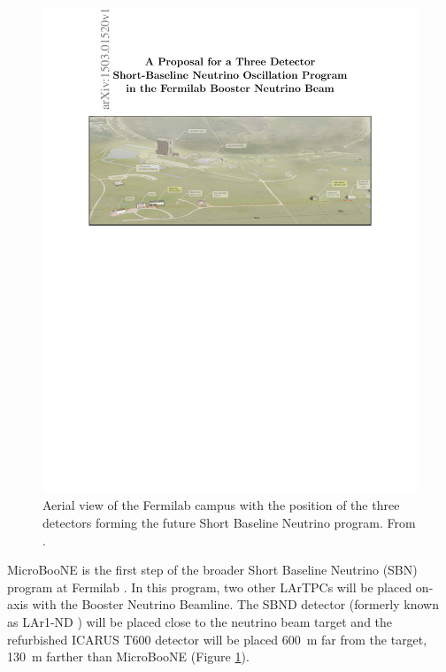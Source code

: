 \begin{figure}[htbp]
    \centering
    \includegraphics[width=0.9\linewidth]{figures/sbn_aerial.pdf}
    \caption{Aerial view of the Fermilab campus with the position of the three detectors forming the future Short Baseline Neutrino program. From \cite{Antonello:2015lea}.}
    \label{fig:sbn_aerial}
\end{figure}

MicroBooNE is the first step of the broader Short Baseline Neutrino (SBN) program at Fermilab \cite{Antonello:2015lea}. In this program, two other LArTPCs will be placed on-axis with the Booster Neutrino Beamline. The SBND detector (formerly known as LAr1-ND \cite{Adams:2013uaa}) will be placed close to the neutrino beam target and the refurbished ICARUS T600 detector \cite{Varanini:2017pvw} will be placed 600~m far from the target, 130~m farther than MicroBooNE (Figure \ref{fig:sbn_aerial}).

